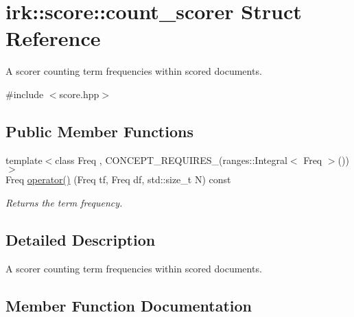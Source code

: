 \hypertarget{structirk_1_1score_1_1count__scorer}{}\section{irk\+:\+:score\+:\+:count\+\_\+scorer Struct Reference}
\label{structirk_1_1score_1_1count__scorer}


A scorer counting term frequencies within scored documents.  




{\ttfamily \#include $<$score.\+hpp$>$}

\subsection*{Public Member Functions}
\begin{DoxyCompactItemize}
\item 
{\footnotesize template$<$class Freq , C\+O\+N\+C\+E\+P\+T\+\_\+\+R\+E\+Q\+U\+I\+R\+E\+S\+\_\+(ranges\+::\+Integral$<$ Freq $>$()) $>$ }\\Freq \mbox{\hyperlink{structirk_1_1score_1_1count__scorer_af22a05d6c437eaed16e10d8ba7eeac24}{operator()}} (Freq tf, Freq df, std\+::size\+\_\+t N) const
\begin{DoxyCompactList}\small\item\em Returns the term frequency. \end{DoxyCompactList}\end{DoxyCompactItemize}


\subsection{Detailed Description}
A scorer counting term frequencies within scored documents. 

\subsection{Member Function Documentation}
\mbox{\label{structirk_1_1score_1_1count__scorer_af22a05d6c437eaed16e10d8ba7eeac24}} 
